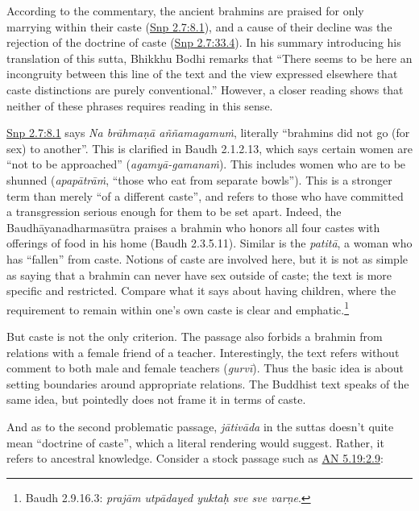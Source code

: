 \documentclass[12pt,openany]{book}%
\begin{document}
According to the commentary, the ancient brahmins are praised for only marrying within their caste (\href{https://suttacentral.net/snp2.7/en/sujato\#8.1}{Snp 2.7:8.1}), and a cause of their decline was the rejection of the doctrine of caste (\href{https://suttacentral.net/snp2.7/en/sujato\#33.4}{Snp 2.7:33.4}). In his summary introducing his translation of this sutta, Bhikkhu Bodhi remarks that “There seems to be here an incongruity between this line of the text and the view expressed elsewhere that caste distinctions are purely conventional.” However, a closer reading shows that neither of these phrases requires reading in this sense.

\href{https://suttacentral.net/snp2.7/en/sujato\#8.1}{Snp 2.7:8.1} says \textit{Na \textsanskrit{brāhmaṇā} \textsanskrit{aññamagamuṁ}}, literally “brahmins did not go (for sex) to another”. This is clarified in Baudh 2.1.2.13, which says certain women are “not to be approached” (\textit{\textsanskrit{agamyā}-\textsanskrit{gamanaṁ}}). This includes women who are to be shunned (\textit{\textsanskrit{apapātrāṁ}}, “those who eat from separate bowls”). This is a stronger term than merely “of a different caste”, and refers to those who have committed a transgression serious enough for them to be set apart. Indeed, the \textsanskrit{Baudhāyanadharmasūtra} praises a brahmin who honors all four castes with offerings of food in his home (Baudh 2.3.5.11). Similar is the \textit{\textsanskrit{patitā}}, a woman who has “fallen” from caste. Notions of caste are involved here, but it is not as simple as saying that a brahmin can never have sex outside of caste; the text is more specific and restricted. Compare what it says about having children, where the requirement to remain within one’s own caste is clear and emphatic.\footnote{Baudh 2.9.16.3: \textit{\textsanskrit{prajām} \textsanskrit{utpādayed} yuktaḥ sve sve \textsanskrit{varṇe}}. }

But caste is not the only criterion. The passage also forbids a brahmin from relations with a female friend of a teacher. Interestingly, the text refers without comment to both male and female teachers (\textit{\textsanskrit{gurvī}}). Thus the basic idea is about setting boundaries around appropriate relations. The Buddhist text speaks of the same idea, but pointedly does not frame it in terms of caste.

And as to the second problematic passage, \textit{\textsanskrit{jātivāda}} in the suttas doesn’t quite mean “doctrine of caste”, which a literal rendering would suggest. Rather, it refers to ancestral knowledge. Consider a stock passage such as \href{https://suttacentral.net/an5.19/en/sujato\#2.9}{AN 5.19:2.9}:
\end{document}
